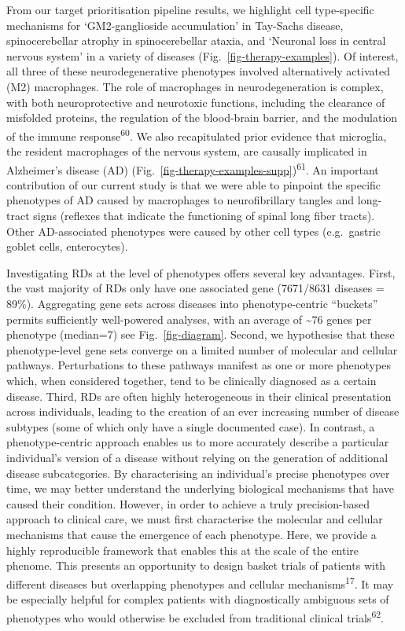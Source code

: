 \documentclass[
]{agujournal2019}
\begin{document}
From our target prioritisation pipeline results, we highlight cell
type-specific mechanisms for `GM2-ganglioside accumulation' in Tay-Sachs
disease, spinocerebellar atrophy in spinocerebellar ataxia, and
`Neuronal loss in central nervous system' in a variety of diseases
(Fig.~\ref{fig-therapy-examples}). Of interest, all three of these
neurodegenerative phenotypes involved alternatively activated (M2)
macrophages. The role of macrophages in neurodegeneration is complex,
with both neuroprotective and neurotoxic functions, including the
clearance of misfolded proteins, the regulation of the blood-brain
barrier, and the modulation of the immune response\textsuperscript{60}.
We also recapitulated prior evidence that microglia, the resident
macrophages of the nervous system, are causally implicated in
Alzheimer's disease (AD)
(Fig.~\ref{fig-therapy-examples-supp})\textsuperscript{61}. An important
contribution of our current study is that we were able to pinpoint the
specific phenotypes of AD caused by macrophages to neurofibrillary
tangles and long-tract signs (reflexes that indicate the functioning of
spinal long fiber tracts). Other AD-associated phenotypes were caused by
other cell types (e.g.~gastric goblet cells, enterocytes).

Investigating RDs at the level of phenotypes offers several key
advantages. First, the vast majority of RDs only have one associated
gene (7671/8631 diseases = 89\%). Aggregating gene sets across diseases
into phenotype-centric ``buckets'' permits sufficiently well-powered
analyses, with an average of \textasciitilde76 genes per phenotype
(median=7) see Fig.~\ref{fig-diagram}. Second, we hypothesise that these
phenotype-level gene sets converge on a limited number of molecular and
cellular pathways. Perturbations to these pathways manifest as one or
more phenotypes which, when considered together, tend to be clinically
diagnosed as a certain disease. Third, RDs are often highly
heterogeneous in their clinical presentation across individuals, leading
to the creation of an ever increasing number of disease subtypes (some
of which only have a single documented case). In contrast, a
phenotype-centric approach enables us to more accurately describe a
particular individual's version of a disease without relying on the
generation of additional disease subcategories. By characterising an
individual's precise phenotypes over time, we may better understand the
underlying biological mechanisms that have caused their condition.
However, in order to achieve a truly precision-based approach to
clinical care, we must first characterise the molecular and cellular
mechanisms that cause the emergence of each phenotype. Here, we provide
a highly reproducible framework that enables this at the scale of the
entire phenome. This presents an opportunity to design basket trials of
patients with different diseases but overlapping phenotypes and cellular
mechanisms\textsuperscript{17}. It may be especially helpful for complex
patients with diagnostically ambiguous sets of phenotypes who would
otherwise be excluded from traditional clinical
trials\textsuperscript{62}.
\end{document}

